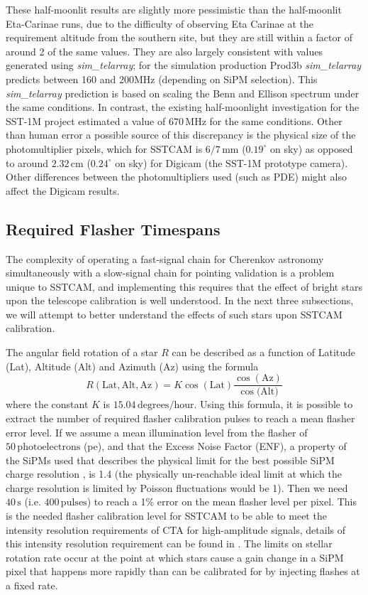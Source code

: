 These half-moonlit results are slightly more pessimistic than the half-moonlit Eta-Carinae runs, due to the difficulty of observing Eta Carinae at the requirement altitude from the southern site, but they are still within a factor of around 2 of the same values. They are also largely consistent with values generated using \textit{sim\_telarray}; for the simulation production Prod3b \textit{sim\_telarray} predicts between 160 and 200MHz (depending on SiPM selection). This \textit{sim\_telarray} prediction is based on scaling the Benn and Ellison spectrum under the same conditions. In contrast, the existing half-moonlight investigation for the SST-1M project \cite{1mcalib} estimated a value of $\mathrm{670\,MHz}$ for the same conditions. Other than human error a possible source of this discrepancy is the physical size of the photomultiplier pixels, which for SSTCAM is $\mathrm{6/7\,mm}$ ($0.19^{\circ}$ on sky) as opposed to around $\mathrm{2.32\,cm}$ ($0.24^{\circ}$ on sky) for Digicam (the SST-1M prototype camera). Other differences between the photomultipliers used (such as PDE) might also affect the Digicam results. 

\subsection{Required Flasher Timespans}

The complexity of operating a fast-signal chain for Cherenkov astronomy simultaneously with a slow-signal chain for pointing validation is a problem unique to SSTCAM, and implementing this requires that the effect of bright stars upon the telescope calibration is well understood. In the next three subsections, we will attempt to better understand the effects of such stars upon SSTCAM calibration.

The angular field rotation of a star $R$ can be described as a function of Latitude (Lat), Altitude (Alt) and Azimuth (Az) using the formula
\begin{equation}
    R(\mathrm{Lat,Alt,Az})=K\cos(\mathrm{Lat})\frac{\cos(\mathrm{Az})}{\cos(\mathrm{Alt)}}
    \label{eq:rot}
\end{equation}
where the constant $K$ is $\mathrm{15.04\,degrees/hour}$. Using this formula, it is possible to extract the number of required flasher calibration pulses to reach a mean flasher error level. If we assume a mean illumination level from the flasher of $50\,\mathrm{photoelectrons}$ (pe), and that the Excess Noise Factor (ENF), a property of the SiPMs used that describes the physical limit for the best possible SiPM charge resolution \cite{jasonthesis}, is 1.4 (the physically un-reachable ideal limit at which the charge resolution is limited by Poisson fluctuations would be 1). Then we need $40\,\mathrm{s}$ (i.e. $400\,\mathrm{pulses}$) to reach a 1\% error on the mean flasher level per pixel. This is the needed flasher calibration level for SSTCAM to be able to meet the intensity resolution requirements of CTA for high-amplitude signals, details of this intensity resolution requirement can be found in \cite{tomintensity}. The limits on stellar rotation rate occur at the point at which stars cause a gain change in a SiPM pixel that happens more rapidly than can be calibrated for by injecting flashes at a fixed rate.

